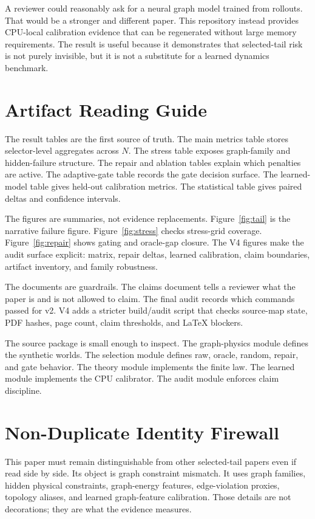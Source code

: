 \documentclass{article}
\begin{document}
A reviewer could reasonably ask for a neural graph model trained from rollouts.
That would be a stronger and different paper.  This repository instead provides
CPU-local calibration evidence that can be regenerated without large memory
requirements.  The result is useful because it demonstrates that selected-tail
risk is not purely invisible, but it is not a substitute for a learned dynamics
benchmark.

\section{Artifact Reading Guide}

The result tables are the first source of truth.  The main metrics table stores
selector-level aggregates across \(N\).  The stress table exposes graph-family
and hidden-failure structure.  The repair and ablation tables explain which
penalties are active.  The adaptive-gate table records the gate decision surface.
The learned-model table gives held-out calibration metrics.  The statistical
table gives paired deltas and confidence intervals.

The figures are summaries, not evidence replacements.  Figure~\ref{fig:tail}
is the narrative failure figure.  Figure~\ref{fig:stress} checks stress-grid
coverage.  Figure~\ref{fig:repair} shows gating and oracle-gap closure.  The V4
figures make the audit surface explicit: matrix, repair deltas, learned
calibration, claim boundaries, artifact inventory, and family robustness.

The documents are guardrails.  The claims document tells a reviewer what the
paper is and is not allowed to claim.  The final audit records which commands
passed for v2.  V4 adds a stricter build/audit script that checks source-map
state, PDF hashes, page count, claim thresholds, and LaTeX blockers.

The source package is small enough to inspect.  The graph-physics module defines
the synthetic worlds.  The selection module defines raw, oracle, random, repair,
and gate behavior.  The theory module implements the finite law.  The learned
module implements the CPU calibrator.  The audit module enforces claim
discipline.

\section{Non-Duplicate Identity Firewall}

This paper must remain distinguishable from other selected-tail papers even if
read side by side.  Its object is graph constraint mismatch.  It uses graph
families, hidden physical constraints, graph-energy features, edge-violation
proxies, topology aliases, and learned graph-feature calibration.  Those details
are not decorations; they are what the evidence measures.
\end{document}
